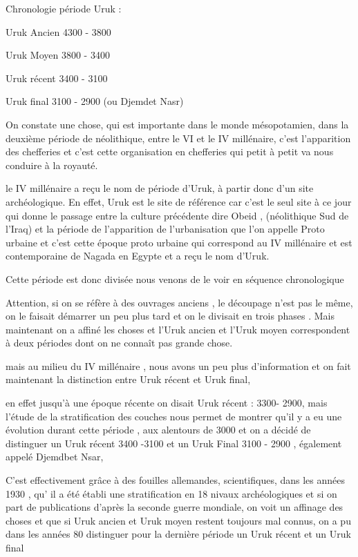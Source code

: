 \documentclass[a4paper,10pt]{article}
\begin{document}
\begin{itemize}
Chronologie période Uruk : 

Uruk Ancien 4300 - 3800

Uruk Moyen 3800 - 3400

Uruk récent  3400 - 3100

Uruk final  3100 - 2900 (ou Djemdet Nasr)

On constate une chose, qui est importante dans le monde mésopotamien,
dans la deuxième période de néolithique, entre le VI et le IV
millénaire, c'est l'apparition des
chefferies et c'est cette organisation en chefferies
qui petit à petit va nous conduire à la royauté.

le IV millénaire a reçu le nom de période d'Uruk,  à
partir donc d'un site archéologique. En effet, Uruk
est le site de référence car c'est le seul site à ce
jour qui donne le passage entre la culture précédente dire Obeid ,
(néolithique Sud de l'Iraq) et la période de
l'apparition de l'urbanisation que
l'on appelle Proto  urbaine et c'est
cette époque proto urbaine qui correspond au IV millénaire et est
contemporaine de Nagada en Egypte et a reçu le nom
d'Uruk.

Cette période est donc divisée nous venons de le voir en séquence
chronologique

Attention, si on se réfère à des ouvrages anciens , le découpage
n'est pas le même, on le faisait démarrer un peu plus
tard et on le divisait en trois phases . Mais maintenant on a affiné
les choses et l'Uruk ancien et l'Uruk
 moyen correspondent à deux périodes dont on ne connaît pas grande
chose.

mais au milieu du IV millénaire , nous avons un peu plus
d'information et on fait maintenant la distinction
entre Uruk récent et Uruk final,

en effet jusqu'à une époque récente on disait Uruk
récent : 3300- 2900, mais l'étude de la stratification
des couches nous permet de montrer qu'il y a eu une
évolution durant cette période , aux alentours de 3000 et on a décidé
de distinguer un Uruk récent 3400 -3100 et un Uruk Final 3100 - 2900 ,
également appelé Djemdbet Nsar, 

C'est effectivement grâce à des fouilles allemandes,
scientifiques, dans les années 1930 , qu' il a été
établi une stratification en 18 nivaux archéologiques et si on part de
publications d'après la seconde guerre mondiale, on
voit un affinage des choses et que si Uruk ancien et Uruk moyen restent
toujours mal connus, on a pu dans les années 80 distinguer pour la
dernière période un Uruk récent et un Uruk final


\end{itemize}
\end{document}
